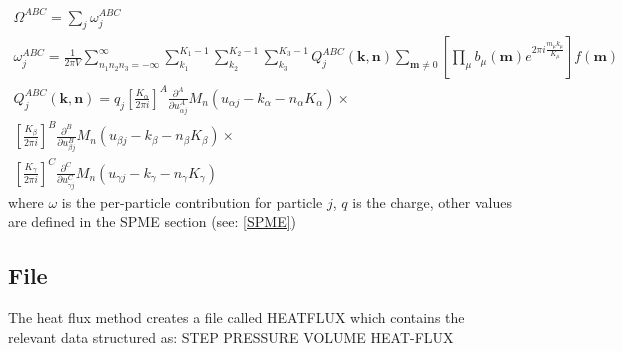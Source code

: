 \begin{equation*}
\begin{gathered}\Omega ^{\mathit{ABC}}=\sum _j\omega _j^{\mathit{ABC}}\\\omega _j^{\mathit{ABC}}=\frac 1{2\pi V}\sum
_{n_1n_2n_3=-\infty }^{\infty }\sum _{k_1}^{K_1-1}\sum _{k_2}^{K_2-1}\sum
_{k_3}^{K_3-1}Q_j^{\mathit{ABC}}(\mathbf k,\mathbf n)\sum _{\mathbf m\neq 0}\left[\prod _{\mu
}b_{\mu }(\mathbf m)e^{2\pi i\frac{m_{\mu }k_{\mu }}{K_{\mu }}}\right]f(\mathbf
m)\\Q_j^{\mathit{ABC}}(\mathbf k,\mathbf n)=q_j\left[\frac{K_{\alpha }}{2\pi i}\right]^A\frac{\partial
^A}{\partial u_{\alpha j}^A}M_n(u_{\alpha j}-k_{\alpha }-n_{\alpha }K_{\alpha })\times \\\left[\frac{K_{\beta }}{2\pi
i}\right]^B\frac{\partial ^B}{\partial u_{\beta j}^B}M_n(u_{\beta j}-k_{\beta }-n_{\beta }K_{\beta })\times
\\\left[\frac{K_{\gamma }}{2\pi i}\right]^C\frac{\partial ^C}{\partial u_{\gamma j}^C}M_n(u_{\gamma j}-k_{\gamma
}-n_{\gamma }K_{\gamma })\end{gathered}
\end{equation*}
where $\omega$ is the per-particle contribution for particle $j$, $q$ is the charge, other values are defined in the SPME section (see: \ref{SPME})
\subsection{File}
The heat flux method creates a file called HEATFLUX which contains the relevant data structured as:
STEP PRESSURE VOLUME HEAT-FLUX
